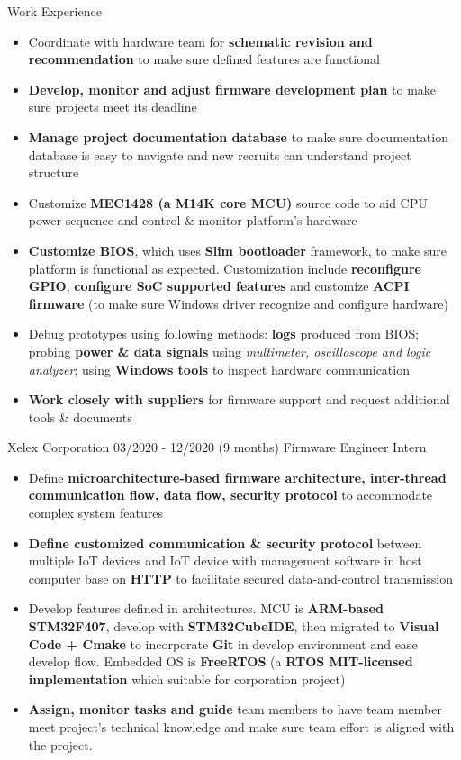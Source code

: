 \documentclass{resume} %
\begin{document}
\begin{rSection}{Work Experience}
\begin{rCompanySubsection}
\begin{itemize}
     \item Coordinate with hardware team for \textbf{schematic revision and recommendation} to make sure defined features are functional
     \item \textbf{Develop, monitor and adjust firmware development plan} to make sure projects meet its deadline 
     \item \textbf{Manage project documentation database} to make sure documentation database is easy to navigate and new recruits can understand project structure
     \item Customize \textbf{MEC1428 (a M14K core MCU)} source code to aid CPU power sequence and control \& monitor platform's hardware
     \item \textbf{Customize BIOS}, which uses {\bf Slim bootloader} framework, to make sure platform is functional as expected. Customization include \textbf{reconfigure GPIO}, \textbf{configure SoC supported features} and customize \textbf{ACPI firmware} (to make sure Windows driver recognize and configure hardware)
     \item Debug prototypes using following methods: \textbf{logs} produced from BIOS; probing \textbf{power \& data signals} using \textit{multimeter, oscilloscope and logic analyzer}; using \textbf{Windows tools} to inspect hardware communication
     \item \textbf{Work closely with suppliers} for firmware support and request additional tools \& documents
     
\end{itemize}
\end{rCompanySubsection}

\begin{rCompanySubsection}
    {Xelex Corporation} 
    {03/2020 - 12/2020 (9 months)} 
    {Firmware Engineer Intern} 
    {}
\begin{itemize}
     \item Define {\bf microarchitecture-based firmware architecture, inter-thread communication flow, data flow, security protocol} to accommodate complex system features
     \item \textbf{Define customized communication \& security protocol} between multiple IoT devices and IoT device with management software in host computer base on \textbf{HTTP} to facilitate secured data-and-control transmission
     \item Develop features defined in architectures. MCU is {\bf ARM-based STM32F407}, develop with {\bf STM32CubeIDE}, then migrated to {\bf Visual Code + Cmake} to incorporate {\bf Git} in develop environment and ease develop flow. Embedded OS is {\bf FreeRTOS} (a  {\bf RTOS MIT-licensed implementation} which suitable for corporation project)
     \item {\bf Assign, monitor tasks and guide} team members to have team member meet project's technical knowledge and make sure team effort is aligned with the project.
     

\end{itemize}
\end{rCompanySubsection}
\end{rSection}
\end{document}
